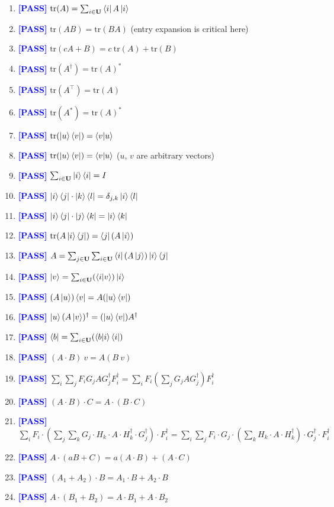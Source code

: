\documentclass[manuscript, review, timestamp]{acmart}
\newcommand{\tr}{\mathrm{tr}}
\newcommand{\pass}{\textcolor{blue}{\textbf{ [PASS] }}}
\begin{document}
\begin{enumerate}
  \item \pass $\tr(A) = \sum_{i \in \mathbf{U}}\bra{i} A \ket{i}$
  \item \pass $\tr(A B) = \tr(B A)$ (entry expansion is critical here)
  \item \pass $\tr(c A + B) = c\ \tr(A) + \tr(B)$
  \item \pass $\tr(A^\dagger) = \tr(A)^*$
  \item \pass $\tr(A^\top) = \tr(A)$
  \item \pass $\tr(A^*) = \tr(A)^*$
  \item \pass $\tr(\ket{u}\bra{v}) = \braket{v|u}$
  \item \pass $\tr(\ket{u}\bra{v}) = \braket{v|u}$ ($u$, $v$ are arbitrary vectors)
  \item \pass $\sum_{i\in\mathbf{U}} \ket{i}\bra{i} = I$
  \item \pass $\ket{i}\bra{j}\cdot\ket{k}\bra{l} = \delta_{j,k}\ket{i}\bra{l}$
  \item \pass $\ket{i}\bra{j}\cdot\ket{j}\bra{k} = \ket{i}\bra{k}$
  \item \pass $\tr(A \ket{i}\bra{j}) = \bra{j} (A \ket{i})$
  \item \pass $A = \sum_{j\in\mathbf{U}}\sum_{i\in\mathbf{U}} \bra{i}(A\ket{j}) \ket{i}\bra{j}$
  \item \pass $\ket{v} = \sum_{i\in\mathbf{U}}(\braket{i|v})\ket{i}$
  \item \pass $(A\ket{u})\bra{v} = A(\ket{u}\bra{v})$
  \item \pass $\ket{u}(A\ket{v})^\dagger = (\ket{u}\bra{v})A^\dagger$
  \item \pass $\bra{b} = \sum_{i\in\mathbf{U}}(\braket{b|i}\bra{i})$
  \item \pass $(A\cdot B)\ v = A (B\ v)$
  \item \pass $\sum_{i}\sum_{j}F_i G_j A G_j^\dagger F_i^\dagger = \sum_i F_i (\sum_j G_j A G_j^\dagger) F_i^\dagger$
  \item \pass $(A\cdot B)\cdot C = A \cdot (B \cdot C)$
  \item \pass $\sum_i F_i \cdot (\sum_j \sum_k G_j \cdot H_k \cdot A \cdot H_k^\dagger \cdot G_j^\dagger) \cdot F_i^\dagger = \sum_i \sum_j F_i \cdot G_j \cdot (\sum_k H_k \cdot A \cdot H_k^\dagger) \cdot G_j^\dagger \cdot F_i^\dagger$
  \item \pass $A\cdot(a B + C) = a (A\cdot B) + (A\cdot C)$
  \item \pass $(A_1 + A_2)\cdot B = A_1 \cdot B + A_2 \cdot B$
  \item \pass $A \cdot (B_1 + B_2) = A \cdot B_1 + A \cdot B_2$

\end{enumerate}
\end{document}
